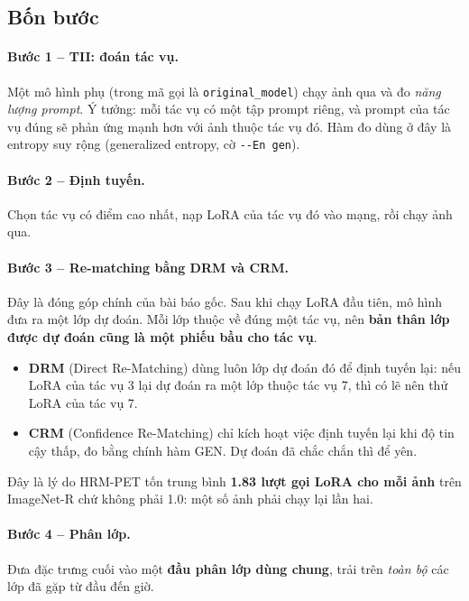 \documentclass[11pt,a4paper]{article}
\begin{document}
\subsection{Bốn bước}

\paragraph{Bước 1 -- TII: đoán tác vụ.}
Một mô hình phụ (trong mã gọi là \texttt{original\_model}) chạy ảnh qua và đo
\emph{năng lượng prompt}. Ý tưởng: mỗi tác vụ có một tập prompt riêng, và prompt
của tác vụ đúng sẽ phản ứng mạnh hơn với ảnh thuộc tác vụ đó. Hàm đo dùng ở đây
là entropy suy rộng (generalized entropy, cờ \texttt{-{}-En gen}).

\paragraph{Bước 2 -- Định tuyến.}
Chọn tác vụ có điểm cao nhất, nạp LoRA của tác vụ đó vào mạng, rồi chạy ảnh qua.

\paragraph{Bước 3 -- Re-matching bằng DRM và CRM.}
Đây là đóng góp chính của bài báo gốc. Sau khi chạy LoRA đầu tiên, mô hình đưa ra
một lớp dự đoán. Mỗi lớp thuộc về đúng một tác vụ, nên \textbf{bản thân lớp được
dự đoán cũng là một phiếu bầu cho tác vụ}.

\begin{itemize}
\item \textbf{DRM} (Direct Re-Matching) dùng luôn lớp dự đoán đó để định tuyến
      lại: nếu LoRA của tác vụ 3 lại dự đoán ra một lớp thuộc tác vụ 7, thì có lẽ
      nên thử LoRA của tác vụ 7.
\item \textbf{CRM} (Confidence Re-Matching) chỉ kích hoạt việc định tuyến lại khi
      độ tin cậy thấp, đo bằng chính hàm GEN. Dự đoán đã chắc chắn thì để yên.
\end{itemize}

Đây là lý do HRM-PET tốn trung bình \textbf{1.83 lượt gọi LoRA cho mỗi ảnh} trên
ImageNet-R chứ không phải 1.0: một số ảnh phải chạy lại lần hai.

\paragraph{Bước 4 -- Phân lớp.}
Đưa đặc trưng cuối vào một \textbf{đầu phân lớp dùng chung}, trải trên
\emph{toàn bộ} các lớp đã gặp từ đầu đến giờ.
\end{document}
